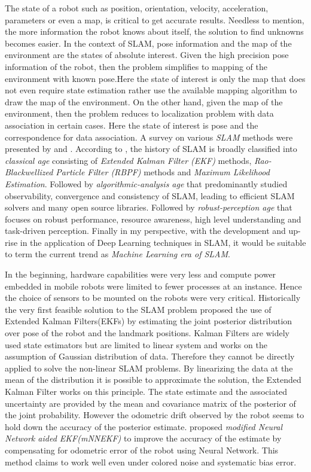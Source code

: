 The state of a robot such as position, orientation, velocity, acceleration, parameters or even a map, is critical to get accurate results. Needless to mention, the more information the robot knows about itself, the solution to find unknowns becomes easier. In the context of SLAM, pose information and the map of the environment are the states of absolute interest. Given the high precision pose information of the robot, then the problem simplifies to mapping of the environment with known pose.Here the state of interest is only the map that does not even require state estimation rather use the available mapping algorithm to draw the map of the environment. On the other hand, given the map of the environment, then the problem reduces to localization problem with data association in certain cases. Here the state of interest is pose and the correspondence for data association. A survey on various \textit{SLAM} methods were presented by \cite{C.Cadena} and \cite{T.Takleh}. According to \cite{C.Cadena}, the history of SLAM is broadly classified into \textit{classical age} consisting of \textit{Extended Kalman Filter (EKF)} methods, \textit{Rao-Blackwellized Particle Filter (RBPF)} methods and \textit{Maximum Likelihood Estimation}. Followed by \textit{algorithmic-analysis age} that predominantly studied observability, convergence and consistency of SLAM, leading to efficient SLAM solvers and many open source libraries. Followed by \textit{robust-perception age} that focuses on robust performance, resource awareness, high level understanding and task-driven perception. Finally in my perspective, with the development and up-rise in the application of Deep Learning techniques in SLAM, it would be suitable to term the current trend as \textit{Machine Learning era of SLAM}.

In the beginning, hardware capabilities were very less and compute power embedded in mobile robots were limited to fewer processes at an instance. Hence the choice of sensors to be mounted on the robots were very critical. Historically the very first feasible solution to the SLAM problem proposed the use of Extended Kalman Filters(EKFs) by estimating the joint posterior distribution over pose of the robot and the landmark positions. Kalman Filters are widely used state estimators but are limited to linear system and works on the assumption of Gaussian distribution of data. Therefore they cannot be directly applied to solve the non-linear SLAM problems. By linearizing the data at the mean of the distribution it is possible to approximate the solution, the Extended Kalman Filter works on this principle. The state estimate and the associated uncertainty are provided by the mean and covariance matrix of the posterior of the joint probability. However the odometric drift observed by the robot seems to hold down the accuracy of the posterior estimate.\cite{J.Kang} proposed \textit{modified Neural Network aided EKF(mNNEKF)} to improve the accuracy of the estimate by compensating for odometric error of the robot using Neural Network. This method claims to work well even under colored noise and systematic bias error.

